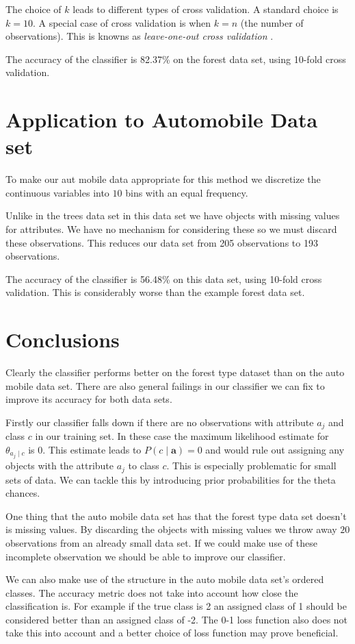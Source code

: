 The choice of $k$ leads to different types of cross validation.
A standard choice is $k=10$. A special case of cross validation is when $k=n$ (the number of observations).
This is knowns as \textit{leave-one-out cross validation} \cite{Priddy05}.

The accuracy of the classifier is 82.37\% on the forest data set, using 10-fold cross validation.

\section{Application to Automobile Data set}

To make our aut mobile data appropriate for this method we discretize the continuous variables into $10$ bins with an equal frequency.

Unlike in the trees data set in this data set we have objects with missing values for attributes.
We have no mechanism for considering these so we must discard these observations.
This reduces our data set from 205 observations to 193 observations.

The accuracy of the classifier is 56.48\% on this data set, using 10-fold cross validation.
This is considerably worse than the example forest data set.

\section{Conclusions}

Clearly the classifier performs better on the forest type dataset than on the auto mobile data set.
There are also general failings in our classifier we can fix to improve its accuracy for both data sets.

Firstly our classifier falls down if there are no observations with attribute $a_j$ and class $c$ in our training set. In these case the maximum likelihood estimate for $\theta_{a_j \mid c}$ is $0$.
This estimate leads to $P(c \mid \mathbf{a}) = 0$ and would rule out assigning any objects with the attribute $a_j$ to class $c$.
This is especially problematic for small sets of data.
We can tackle this by introducing prior probabilities for the theta chances.

One thing that the auto mobile data set has that the forest type data set doesn't is missing values.
By discarding the objects with missing values we throw away $20$ observations from an already small data set.
If we could make use of these incomplete observation we should be able to improve our classifier.

We can also make use of the structure in the auto mobile data set's ordered classes.
The accuracy metric does not take into account how close the classification is.
For example if the true class is 2 an assigned class of 1 should be considered better than an assigned class of -2.
The 0-1 loss function also does not take this into account and a better choice of loss function may prove beneficial.

